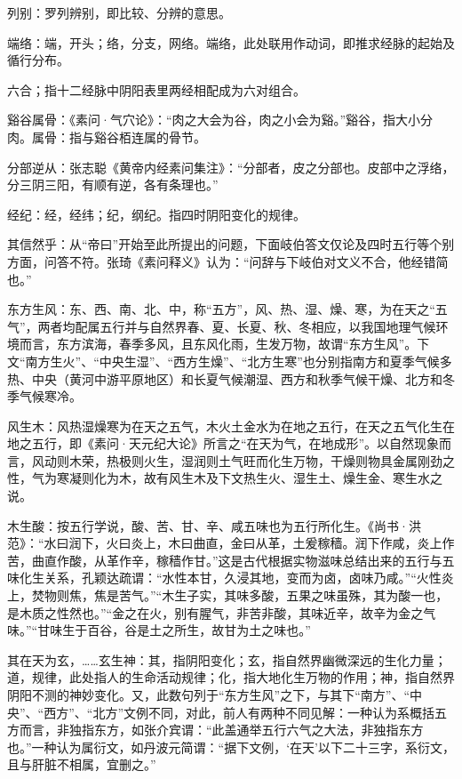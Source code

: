 \documentclass[12pt]{ctexbook}
\begin{document}
\begin{jiaozhu}
	\item 列别：罗列辨别，即比较、分辨的意思。
	\item 端络：端，开头；络，分支，网络。端络，此处联用作动词，即推求经脉的起始及循行分布。
	\item 六合；指十二经脉中阴阳表里两经相配成为六对组合。
	\item 谿谷属骨：《素问·气穴论》：“肉之大会为谷，肉之小会为谿。”谿谷，指大小分肉。属骨：指与谿谷栢连属的骨节。
	\item 分部逆从：张志聪《黄帝内经素问集注》：“分部者，皮之分部也。皮部中之浮络，分三阴三阳，有顺有逆，各有条理也。”
	\item 经纪：经，经纬；纪，纲纪。指四时阴阳变化的规律。
	\item 其信然乎：从“帝曰”开始至此所提出的问题，下面岐伯答文仅论及四时五行等个别方面，问答不符。张琦《素问释义》认为：“问辞与下岐伯对文义不合，他经错简也。”
	\item 东方生风：东、西、南、北、中，称“五方”，风、热、湿、燥、寒，为在天之“五气”，两者均配属五行并与自然界春、夏、长夏、秋、冬相应，以我国地理气候环境而言，东方滨海，春季多风，且东风化雨，生发万物，故谓“东方生风”。下文“南方生火”、“中央生湿”、“西方生燥”、“北方生寒”也分别指南方和夏季气候多热、中央（黄河中游平原地区）和长夏气候潮湿、西方和秋季气候干燥、北方和冬季气候寒冷。
	\item 风生木：风热湿燥寒为在天之五气，木火土金水为在地之五行，在天之五气化生在地之五行，即《素问·天元纪大论》所言之“在天为气，在地成形”。以自然现象而言，风动则木荣，热极则火生，湿润则土气旺而化生万物，干燥则物具金属刚劲之性，气为寒凝则化为木，故有风生木及下文热生火、湿生土、燥生金、寒生水之说。
	\item 木生酸：按五行学说，酸、苦、甘、辛、咸五味也为五行所化生。《尚书·洪范》：“水曰润下，火曰炎上，木曰曲直，金曰从革，土爰稼穑。润下作咸，炎上作苦，曲直作酸，从革作辛，稼穑作甘。”这是古代根据实物滋味总结出来的五行与五味化生关系，孔颖达疏谓：“水性本甘，久浸其地，变而为卤，卤味乃咸。”“火性炎上，焚物则焦，焦是苦气。”“木生子实，其味多酸，五果之味虽殊，其为酸一也，是木质之性然也。”“金之在火，别有腥气，非苦非酸，其味近辛，故辛为金之气味。”“甘味生于百谷，谷是土之所生，故甘为土之味也。”
	\item 其在天为玄，……玄生神：其，指阴阳变化；玄，指自然界幽微深远的生化力量；道，规律，此处指人的生命活动规律；化，指大地化生万物的作用；神，指自然界阴阳不测的神妙变化。又，此数句列于“东方生风”之下，与其下“南方”、“中央”、“西方”、“北方”文例不同，对此，前人有两种不同见解：一种认为系概括五方而言，非独指东方，如张介宾谓：“此盖通举五行六气之大法，非独指东方也。”一种认为属衍文，如丹波元简谓：“据下文例，‘在天’以下二十三字，系衍文，且与肝脏不相属，宜删之。”

\end{jiaozhu}
\end{document}
